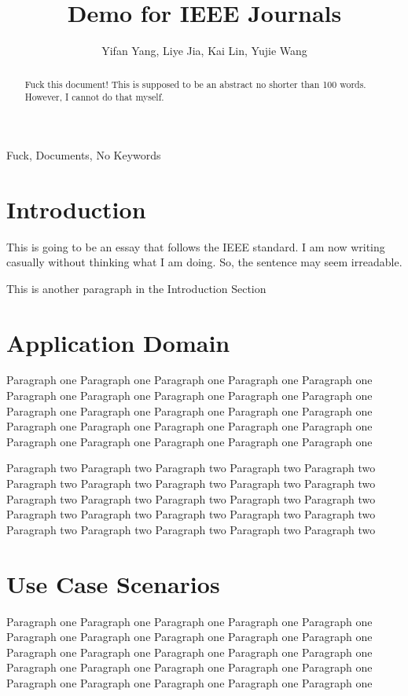\documentclass[10pt,journal,final,a4paper,nofonttune]{IEEEtran}
\title{Demo for IEEE Journals}
\author{Yifan Yang, Liye Jia, Kai Lin, Yujie Wang}
\begin{document}
\maketitle

\begin{abstract}
    Fuck this document! This is supposed to be an abstract no shorter 
    than 100 words. However, I cannot do that myself.
\end{abstract}

\begin{IEEEkeywords}
    Fuck, Documents, No Keywords
\end{IEEEkeywords}


\section{Introduction}
This is going to be an essay that follows the IEEE standard.
I am now writing casually without thinking what I am doing. So, the 
sentence may seem irreadable.
\cite{gomez2012overview}

This is another paragraph in the Introduction Section

\section{Application Domain}
Paragraph one Paragraph one Paragraph one Paragraph one Paragraph one 
Paragraph one Paragraph one Paragraph one Paragraph one Paragraph one 
Paragraph one Paragraph one Paragraph one Paragraph one Paragraph one 
Paragraph one Paragraph one Paragraph one Paragraph one Paragraph one 
Paragraph one Paragraph one Paragraph one Paragraph one Paragraph one 

Paragraph two Paragraph two Paragraph two Paragraph two Paragraph two 
Paragraph two Paragraph two Paragraph two Paragraph two Paragraph two 
Paragraph two Paragraph two Paragraph two Paragraph two Paragraph two 
Paragraph two Paragraph two Paragraph two Paragraph two Paragraph two 
Paragraph two Paragraph two Paragraph two Paragraph two Paragraph two 

\section{Use Case Scenarios}
Paragraph one Paragraph one Paragraph one Paragraph one Paragraph one 
Paragraph one Paragraph one Paragraph one Paragraph one Paragraph one 
Paragraph one Paragraph one Paragraph one Paragraph one Paragraph one 
Paragraph one Paragraph one Paragraph one Paragraph one Paragraph one 
Paragraph one Paragraph one Paragraph one Paragraph one Paragraph one 
\end{document}
